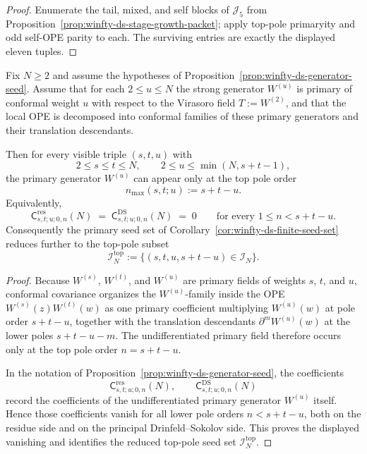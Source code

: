 \begin{proof}
Enumerate the tail, mixed, and self blocks of $\mathcal{J}_5$ from Proposition~\ref{prop:winfty-ds-stage-growth-packet}; apply top-pole primaryity and odd self-OPE parity to each. The surviving entries are exactly the displayed eleven tuples.
\end{proof}

\begin{proposition}
\label{prop:winfty-ds-primary-top-pole}
Fix $N \ge 2$ and assume the hypotheses of
Proposition~\ref{prop:winfty-ds-generator-seed}. Assume that
for each $2 \le u \le N$ the strong generator $W^{(u)}$ is primary of
conformal weight $u$ with respect to the Virasoro field
$T:=W^{(2)}$, and that the local OPE is decomposed into conformal
families of these primary generators and their translation
descendants.

Then for every visible triple $(s,t,u)$ with
\[
2 \le s \le t \le N,
\qquad
2 \le u \le \min(N,s+t-1),
\]
the primary generator $W^{(u)}$ can appear only at the top pole order
\[
n_{\max}(s,t;u):=s+t-u.
\]
Equivalently,
\[
\mathsf{C}^{\mathrm{res}}_{s,t;u;0,n}(N)
\;=\;
\mathsf{C}^{\mathrm{DS}}_{s,t;u;0,n}(N)
\;=\;0
\qquad\text{for every } 1\le n < s+t-u.
\]
Consequently the primary seed set of
Corollary~\ref{cor:winfty-ds-finite-seed-set} reduces further to the
top-pole subset
\[
\mathcal{I}_N^{\mathrm{top}}
:=\{(s,t,u,s+t-u)\in \mathcal{I}_N\}.
\]
\end{proposition}

\begin{proof}
Because $W^{(s)}$, $W^{(t)}$, and $W^{(u)}$ are primary fields of
weights $s$, $t$, and $u$, conformal covariance organizes the
$W^{(u)}$-family inside the OPE
$W^{(s)}(z)W^{(t)}(w)$ as one primary coefficient multiplying
$W^{(u)}(w)$ at pole order $s+t-u$, together with the translation
descendants $\partial^m W^{(u)}(w)$ at the lower poles
$s+t-u-m$. The undifferentiated primary field therefore occurs only at
the top pole order $n=s+t-u$.

In the notation of
Proposition~\ref{prop:winfty-ds-generator-seed}, the coefficients
\[
\mathsf{C}^{\mathrm{res}}_{s,t;u;0,n}(N),
\qquad
\mathsf{C}^{\mathrm{DS}}_{s,t;u;0,n}(N)
\]
record the coefficients of the undifferentiated primary generator
$W^{(u)}$ itself. Hence those coefficients vanish for all lower pole
orders $n<s+t-u$, both on the residue side and on the principal
Drinfeld--Sokolov side. This proves the displayed vanishing and
identifies the reduced top-pole seed set $\mathcal{I}_N^{\mathrm{top}}$.
\end{proof}


